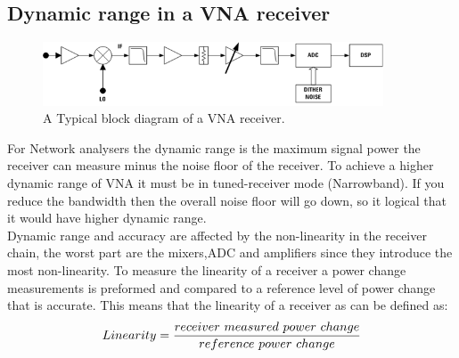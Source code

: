 \subsection{Dynamic range in a VNA receiver}
\begin{figure}[H]
\centering
\includegraphics[width=0.90\textwidth]{figures/Block_VNA.png}
\caption{A Typical block diagram of a VNA receiver.}
\label{Block_VNA}
\end{figure}

For Network analysers the dynamic range is the maximum signal power the receiver can measure minus the noise floor of the receiver. To achieve a higher dynamic range of \gls{VNA} it must be  in tuned-receiver mode (Narrowband).
If you reduce the bandwidth then the overall noise floor will go down, so it logical that it would have higher dynamic range. \citep{AgilentNVA} \\

Dynamic range and accuracy are affected by the non-linearity in the receiver chain, the worst part are the mixers,\gls{ADC} and amplifiers since they introduce the most non-linearity. To measure the linearity of a receiver a power change measurements is preformed and compared to a reference level of power change that is accurate. This means that the linearity of a receiver as can be defined as:
\begin{equation}
Linearity = \frac{receiver \\\ measured \\\ power \\\ change}{reference \ power \ change}
\label{Linearity}
\end{equation}
 

